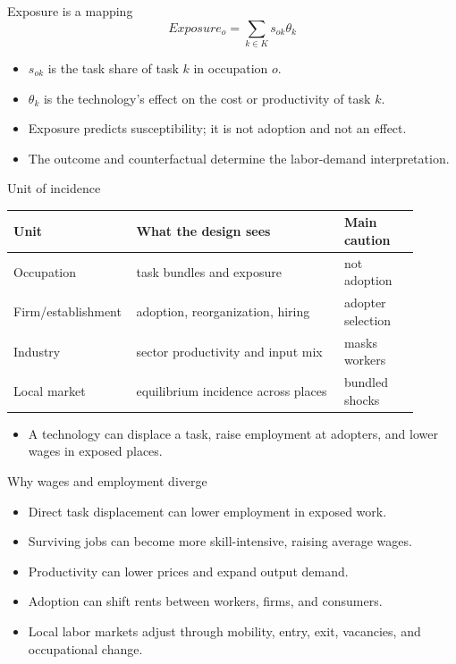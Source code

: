 \documentclass[aspectratio=169,11pt]{beamer}
\begin{document}
\begin{frame}{Exposure is a mapping}
\[
Exposure_o = \sum_{k \in K} s_{ok}\theta_k
\]
\begin{itemize}
    \item $s_{ok}$ is the task share of task $k$ in occupation $o$.
    \item $\theta_k$ is the technology's effect on the cost or productivity of task $k$.
    \item Exposure predicts susceptibility; it is not adoption and not an effect.
    \item The outcome and counterfactual determine the labor-demand interpretation.
\end{itemize}
\end{frame}

\begin{frame}{Unit of incidence}
\small
\begin{tabular}{p{0.22\linewidth} p{0.50\linewidth} p{0.18\linewidth}}
\toprule
Unit & What the design sees & Main caution \\
\midrule
Occupation & task bundles and exposure & not adoption \\
Firm/establishment & adoption, reorganization, hiring & adopter selection \\
Industry & sector productivity and input mix & masks workers \\
Local market & equilibrium incidence across places & bundled shocks \\
\bottomrule
\end{tabular}
\vspace{0.35cm}
\begin{itemize}
    \item A technology can displace a task, raise employment at adopters, and lower wages in exposed places.
\end{itemize}
\end{frame}

\begin{frame}{Why wages and employment diverge}
\begin{itemize}
    \item Direct task displacement can lower employment in exposed work.
    \item Surviving jobs can become more skill-intensive, raising average wages.
    \item Productivity can lower prices and expand output demand.
    \item Adoption can shift rents between workers, firms, and consumers.
    \item Local labor markets adjust through mobility, entry, exit, vacancies, and occupational change.
\end{itemize}
\end{frame}
\end{document}

